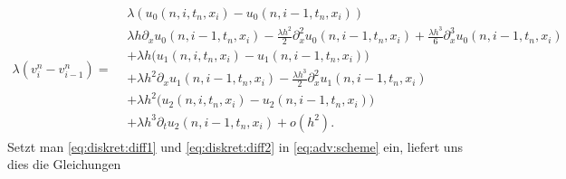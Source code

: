 { 
\begin{align} \label{eq:diskret:diff2}
\lambda (v^n_i - v^n_{i-1}) =
\begin{split}
& \lambda( u_0(n, i, t_n, x_i) - u_0(n, i-1, t_n, x_i) )\\
&\lambda h \partial_x u_0(n, i-1, t_n, x_i) - \frac {\lambda h^2}{2} \partial^2_x u_0(n, i-1, t_n, x_i) + \frac {\lambda h^3}{6} \partial^3_x u_0(n, i-1, t_n, x_i)\\
&+ \lambda h \bigl( u_1(n, i, t_n, x_i) - u_1(n, i-1, t_n, x_i) \bigr)\\
&+ \lambda h^2 \partial_x u_1(n, i-1, t_n, x_i) - \frac {\lambda h^3}{2} \partial^2_x u_1(n, i-1, t_n, x_i)\\
&+ \lambda h^2 \bigl( u_2(n, i, t_n, x_i) - u_2(n, i-1, t_n, x_i) \bigr)\\
&+ \lambda h^3 \partial_t u_2(n, i-1, t_n, x_i) + o(h^2).
\end{split}
\end{align}
}
\noindent
Setzt man \eqref{eq:diskret:diff1} und \eqref{eq:diskret:diff2} in \eqref{eq:adv:scheme} ein, liefert uns dies die Gleichungen


